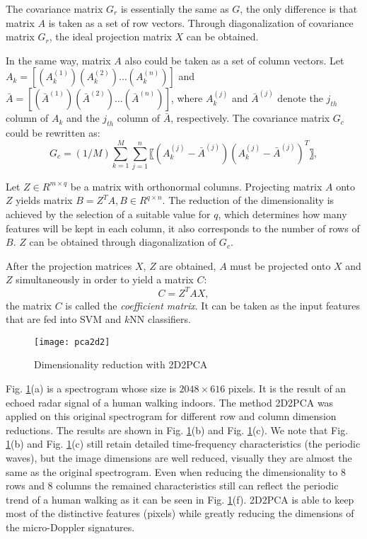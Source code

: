 The covariance matrix $G_r$ is essentially the same as $G$, the only difference is that matrix $A$ is taken as a set of row vectors. Through diagonalization of covariance matrix $G_r$, the ideal projection matrix $X$ can be obtained.

In the same way, matrix $A$ also could be taken as a set of column vectors. Let $A_k=[(A_k^{(1)} )(A_k^{(2)})\ldots(A_k^{(n)})]$ and $\bar{A}=[(\bar{A}^{(1)})(\bar{A}^{(2)} )\ldots(\bar{A}^{(n)})]$, where $A_k^{(j) }$ and $\bar{A}^{(j)}$ denote the $j_{th}$ column of $A_k$ and the $j_{th}$ column of $\bar{A}$, respectively. The covariance matrix  $G_c$ could be rewritten as:
\begin{equation}
G_c=(1/M) \sum_{k=1}^{M}\sum_{j=1}^{n}〖(A_k^{(j)}  -\bar{A}^{(j)} ) (A_k^{(j)}  -\bar{A}^{(j)})^T〗,
\end{equation}

Let $Z\in R^{m \times q}$ be a matrix with orthonormal columns.  Projecting matrix $A$ onto $Z$ yields matrix $B=Z^T A,B\in R^{q \times n}$. The reduction of the dimensionality is achieved by the selection of a suitable value for $q$, which determines how many features will be kept in each column, it also corresponds to the number of rows of $B$. $Z$ can be obtained through diagonalization of $G_c$.

After the projection matrices $X$, $Z$ are obtained, $A$ must be projected onto $X$ and $Z$ simultaneously in order to yield a matrix $C$:
\begin{equation}
C=Z^T AX,
\end{equation}
the matrix $C$ is called the \textit{coefficient matrix}. It can be taken as the input features that are fed into SVM and $k$NN classifiers.
\begin{figure}[!t]
\centering
\texttt{[image: pca2d2]}
\caption{Dimensionality reduction with 2D2PCA}
\label{fig_tf}
\end{figure}

Fig. \ref{fig_tf}(a) is a spectrogram whose size is $2048\times 616$ pixels. It is the result of an echoed radar signal of a human walking indoors. The method 2D2PCA was applied on this original spectrogram for different row and column dimension reductions. The results are shown in Fig. \ref{fig_tf}(b) and Fig. \ref{fig_tf}(c). We note that Fig. \ref{fig_tf}(b) and Fig. \ref{fig_tf}(c) still retain detailed time-frequency characteristics (the periodic waves), but the image dimensions are well reduced, visually they are almost the same as the original spectrogram. Even when reducing the dimensionality to 8 rows and 8 columns the remained characteristics still can reflect the periodic trend of a human walking as it can be seen in Fig. \ref{fig_tf}(f). 2D2PCA is able to keep most of the distinctive features (pixels) while greatly reducing the dimensions of the micro-Doppler signatures.